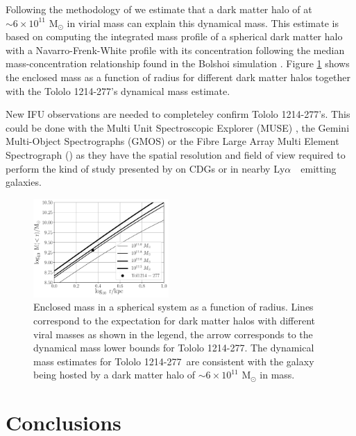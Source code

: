 \documentclass[a4paper,fleqn,usenatbib]{mnras}
\newcommand{\tol}{Tololo 1214-277}
\newcommand{\lya}{\ifmmode{{\rm Ly}\alpha}\else Ly$\alpha$\ \fi}
\begin{document}
Following the methodology of \citet{2011ApJ...726..108T} we estimate 
that a dark matter halo of at $\sim 6\times 10^{11}$ M$_{\odot}$ in
virial mass can explain this dynamical mass.
This estimate is based on computing the integrated mass profile of a
spherical dark matter halo with a Navarro-Frenk-White profile with its
concentration following the median mass-concentration
relationship found in the Bolshoi simulation
\citep{2012MNRAS.423.3018P,2016ApJ...832..169P}.  
Figure \ref{fig:mass} shows the enclosed mass as a function of radius
for different dark matter halos together with the \tol's dynamical
mass estimate. 

New IFU observations are needed to completeley confirm \tol's.
This could be done with the Multi Unit Spectroscopic Explorer (MUSE) 
\citep{2014Msngr.157...13B}, the Gemini Multi-Object Spectrographs (GMOS) 
\citep{2004PASP..116..425H} or the Fibre Large Array Multi Element
Spectrograph (\citep{2002Msngr.110....1P}) as they have the spatial
resolution and field of view required to perform the kind of study
presented by \citep{2015A&A...577A..21C} on CDGs or \citep{Herenz16}
in nearby \lya\ emitting galaxies.



\begin{figure}
\begin{center}
\includegraphics[width=0.46\textwidth]{enclosed_mass.pdf}
\caption{Enclosed mass in a spherical system as a function of radius.
  Lines correspond to the expectation for dark matter halos with
  different viral masses as shown in the legend, the arrow corresponds
  to the dynamical mass lower bounds for \tol.  
  The dynamical mass estimates for \tol\ are consistent with the
  galaxy being hosted by a dark matter halo of
  $\sim 6\times10^{11}$ M$_{\odot}$ in mass.
    \label{fig:mass}} 
\end{center}
\end{figure}


\section{Conclusions}
\label{sec:conclusions}
\end{document}
